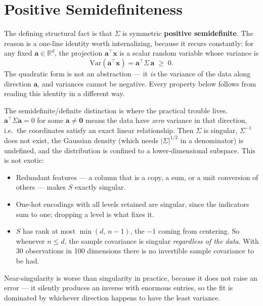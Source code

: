 \documentclass[conference]{IEEEtran}
\begin{document}
\section*{Positive Semidefiniteness}
The defining structural fact is that $\Sigma$ is symmetric \textbf{positive semidefinite}. The reason is a one-line identity worth internalizing, because it recurs constantly: for any fixed $\mathbf{a} \in \mathbb{R}^d$, the projection $\mathbf{a}^{\!\top}\mathbf{x}$ is a scalar random variable whose variance is
\begin{equation}
    \mathrm{Var}(\mathbf{a}^{\!\top}\mathbf{x}) = \mathbf{a}^{\!\top}\Sigma\,\mathbf{a} \;\geq\; 0 .
\end{equation}
The quadratic form is not an abstraction --- it \textit{is} the variance of the data along direction $\mathbf{a}$, and variances cannot be negative. Every property below follows from reading this identity in a different way.

The semidefinite/definite distinction is where the practical trouble lives. $\mathbf{a}^{\!\top}\Sigma\mathbf{a} = 0$ for some $\mathbf{a} \neq \mathbf{0}$ means the data have \textit{zero} variance in that direction, i.e.\ the coordinates satisfy an exact linear relationship. Then $\Sigma$ is singular, $\Sigma^{-1}$ does not exist, the Gaussian density (which needs $|\Sigma|^{1/2}$ in a denominator) is undefined, and the distribution is confined to a lower-dimensional subspace. This is not exotic:
\begin{itemize}
    \item Redundant features --- a column that is a copy, a sum, or a unit conversion of others --- makes $S$ exactly singular.
    \item One-hot encodings with all levels retained are singular, since the indicators sum to one; dropping a level is what fixes it.
    \item $S$ has rank at most $\min(d,\, n-1)$, the $-1$ coming from centering. So whenever $n \leq d$, the sample covariance is singular \textit{regardless of the data}. With 30 observations in 100 dimensions there is no invertible sample covariance to be had.
\end{itemize}
Near-singularity is worse than singularity in practice, because it does not raise an error --- it silently produces an inverse with enormous entries, so the fit is dominated by whichever direction happens to have the least variance.
\end{document}
